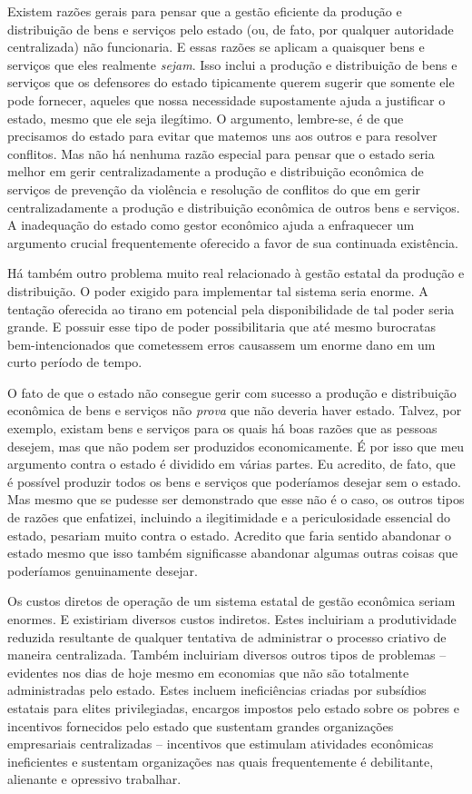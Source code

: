 Existem razões gerais para pensar que a gestão eficiente da produção e distribuição de bens e serviços pelo estado (ou, de fato, por qualquer autoridade centralizada) não funcionaria. E essas razões se aplicam a quaisquer bens e serviços que eles realmente \emph{sejam}. Isso inclui a produção e distribuição de bens e serviços que os defensores do estado tipicamente querem sugerir que somente ele pode fornecer, aqueles que nossa necessidade supostamente ajuda a justificar o estado, mesmo que ele seja ilegítimo. O argumento, lembre-se, é de que precisamos do estado para evitar que matemos uns aos outros e para resolver conflitos. Mas não há nenhuma razão especial para pensar que o estado seria melhor em gerir centralizadamente a produção e distribuição econômica de serviços de prevenção da violência e resolução de conflitos do que em gerir centralizadamente a produção e distribuição econômica de outros bens e serviços. A inadequação do estado como gestor econômico ajuda a enfraquecer um argumento crucial frequentemente oferecido a favor de sua continuada existência.

Há também outro problema muito real relacionado à gestão estatal da produção e distribuição. O poder exigido para implementar tal sistema seria enorme. A tentação oferecida ao tirano em potencial pela disponibilidade de tal poder seria grande. E possuir esse tipo de poder possibilitaria que até mesmo burocratas bem-intencionados que cometessem erros causassem um enorme dano em um curto período de tempo.

O fato de que o estado não consegue gerir com sucesso a produção e distribuição econômica de bens e serviços não \emph{prova} que não deveria haver estado. Talvez, por exemplo, existam bens e serviços para os quais há boas razões que as pessoas desejem, mas que não podem ser produzidos economicamente. É por isso que meu argumento contra o estado é dividido em várias partes. Eu acredito, de fato, que é possível produzir todos os bens e serviços que poderíamos desejar sem o estado. Mas mesmo que se pudesse ser demonstrado que esse não é o caso, os outros tipos de razões que enfatizei, incluindo a ilegitimidade e a periculosidade essencial do estado, pesariam muito contra o estado. Acredito que faria sentido abandonar o estado mesmo que isso também significasse abandonar algumas outras coisas que poderíamos genuinamente desejar.

Os custos diretos de operação de um sistema estatal de gestão econômica seriam enormes. E existiriam diversos custos indiretos. Estes incluiriam a produtividade reduzida resultante de qualquer tentativa de administrar o processo criativo de maneira centralizada. Também incluiriam diversos outros tipos de problemas -- evidentes nos dias de hoje mesmo em economias que não são totalmente administradas pelo estado. Estes incluem ineficiências criadas por subsídios estatais para elites privilegiadas, encargos impostos pelo estado sobre os pobres e incentivos fornecidos pelo estado que sustentam grandes organizações empresariais centralizadas -- incentivos que estimulam atividades econômicas ineficientes e sustentam organizações nas quais frequentemente é debilitante, alienante e opressivo trabalhar.

